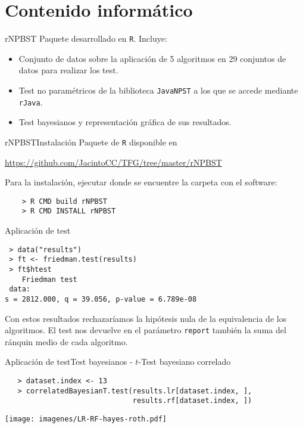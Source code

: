 \documentclass[leqno]{beamer}
\theoremstyle{definition_wo_parentheses}
\begin{document}
\section{Contenido informático}

\begin{frame}{rNPBST}
	Paquete desarrollado en \texttt{R}. Incluye:
	
\begin{itemize}
\item Conjunto de datos sobre la aplicación de 5 algoritmos 
	en 29 conjuntos de datos para realizar los test.
\item Test no paramétricos de la biblioteca \texttt{JavaNPST} 
	a los que se accede mediante \texttt{rJava}.
\item Test bayesianos y representación gráfica de 
	sus resultados.
\end{itemize}
\end{frame}

\begin{frame}[fragile]{rNPBST}{Instalación}
Paquete de \texttt{R} disponible en 
\begin{center}
\url{https://github.com/JacintoCC/TFG/tree/master/rNPBST}
\end{center}
Para la instalación, ejecutar donde se encuentre la carpeta con el software:
	\begin{verbatim}
	> R CMD build rNPBST
	> R CMD INSTALL rNPBST
	\end{verbatim}
\end{frame}

\begin{frame}[fragile]{Aplicación de test}
\begin{verbatim}
 > data("results")
 > ft <- friedman.test(results)
 > ft$htest
 	Friedman test
 data:  
s = 2812.000, q = 39.056, p-value = 6.789e-08
\end{verbatim}
Con estos resultados rechazaríamos la hipótesis nula de la 
equivalencia de los algoritmos. El test nos devuelve en el 
parámetro \texttt{report} también la suma del ránquin
medio de cada algoritmo. 
\end{frame}


\begin{frame}[fragile]{Aplicación de test}{Test bayesianos - $t$-Test bayesiano correlado}
   \begin{verbatim}
   > dataset.index <- 13
   > correlatedBayesianT.test(results.lr[dataset.index, ],
                              results.rf[dataset.index, ])
   \end{verbatim}
   \begin{center}
   \texttt{[image: imagenes/LR-RF-hayes-roth.pdf]}
   \end{center}
\end{frame}
\end{document}
